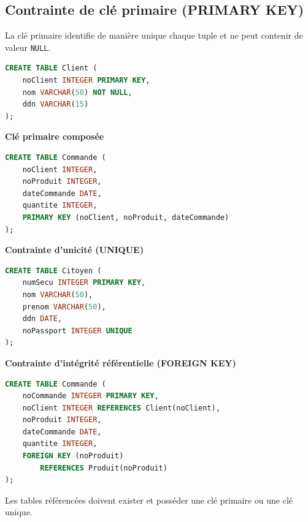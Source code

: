 
\subsection{Contrainte de clé primaire (PRIMARY KEY)}

La clé primaire identifie de manière unique chaque tuple et ne peut contenir
de valeur \texttt{NULL}.

\begin{sqlcodebox}
\begin{lstlisting}[language=SQL]
CREATE TABLE Client (
    noClient INTEGER PRIMARY KEY,
    nom VARCHAR(50) NOT NULL,
    ddn VARCHAR(15)
);
\end{lstlisting}
\end{sqlcodebox}

\textbf{Clé primaire composée}

\begin{sqlcodebox}
\begin{lstlisting}[language=SQL]
CREATE TABLE Commande (
    noClient INTEGER,
    noProduit INTEGER,
    dateCommande DATE,
    quantite INTEGER,
    PRIMARY KEY (noClient, noProduit, dateCommande)
);
\end{lstlisting}
\end{sqlcodebox}

\textbf{Contrainte d’unicité (UNIQUE)}

\begin{sqlcodebox}
\begin{lstlisting}[language=SQL]
CREATE TABLE Citoyen (
    numSecu INTEGER PRIMARY KEY,
    nom VARCHAR(50),
    prenom VARCHAR(50),
    ddn DATE,
    noPassport INTEGER UNIQUE
);
\end{lstlisting}
\end{sqlcodebox}

\textbf{Contrainte d’intégrité référentielle (FOREIGN KEY)}

\begin{sqlcodebox}
\begin{lstlisting}[language=SQL]
CREATE TABLE Commande (
    noCommande INTEGER PRIMARY KEY,
    noClient INTEGER REFERENCES Client(noClient),
    noProduit INTEGER,
    dateCommande DATE,
    quantite INTEGER,
    FOREIGN KEY (noProduit)
        REFERENCES Produit(noProduit)
);
\end{lstlisting}
\end{sqlcodebox}

Les tables référencées doivent exister et posséder une clé primaire ou une clé
unique.


